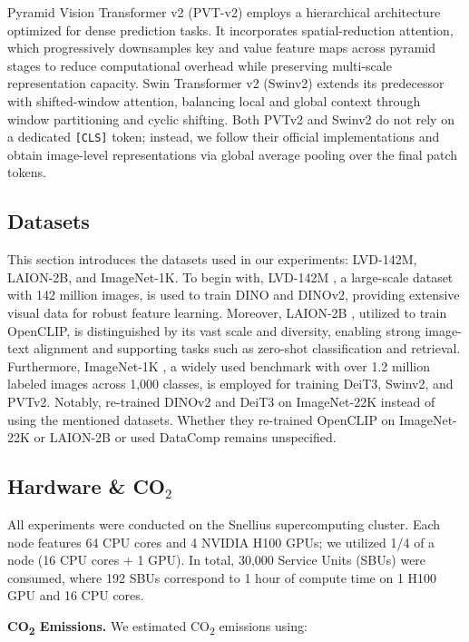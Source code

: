\documentclass[10pt]{article} %
\begin{document}
Pyramid Vision Transformer v2 (PVT-v2) \citep{wang2022pvt} employs a hierarchical architecture optimized for dense prediction tasks. It incorporates spatial-reduction attention, which progressively downsamples key and value feature maps across pyramid stages to reduce computational overhead while preserving multi-scale representation capacity. Swin Transformer v2 (Swinv2) \citep{liu2021swin} extends its predecessor with shifted-window attention, balancing local and global context through window partitioning and cyclic shifting. Both PVTv2 and Swinv2 do not rely on a dedicated \texttt{[CLS]} token; instead, we follow their official implementations and obtain image-level representations via global average pooling over the final patch tokens.

\subsection{Datasets}
This section introduces the datasets used in our experiments: LVD-142M, LAION-2B, and ImageNet-1K. To begin with, LVD-142M \citep{oquab2023dinov2}, a large-scale dataset with 142 million images, is used to train DINO and DINOv2, providing extensive visual data for robust feature learning. Moreover, LAION-2B \citep{laion5b}, utilized to train OpenCLIP, is distinguished by its vast scale and diversity, enabling strong image-text alignment and supporting tasks such as zero-shot classification and retrieval. Furthermore, ImageNet-1K \citep{deng2009imagenet}, a widely used benchmark with over 1.2 million labeled images across 1,000 classes, is employed for training DeiT3, Swinv2, and PVTv2. Notably, \citet{darcet2024registers} re-trained DINOv2 and DeiT3 on ImageNet-22K instead of using the mentioned datasets. Whether they re-trained OpenCLIP on ImageNet-22K or LAION-2B or used DataComp \citep{datacomp2023} remains unspecified.

\subsection{Hardware \& \texorpdfstring{CO$_2$}{CO2}}
All experiments were conducted on the Snellius supercomputing cluster. Each node features 64 CPU cores and 4 NVIDIA H100 GPUs; we utilized 1/4 of a node (16 CPU cores + 1 GPU). In total, 30,000 Service Units (SBUs) were consumed, where 192 SBUs correspond to 1 hour of compute time on 1 H100 GPU and 16 CPU cores.

\textbf{CO\textsubscript{2} Emissions.}  
We estimated CO\textsubscript{2} emissions using:
\end{document}
